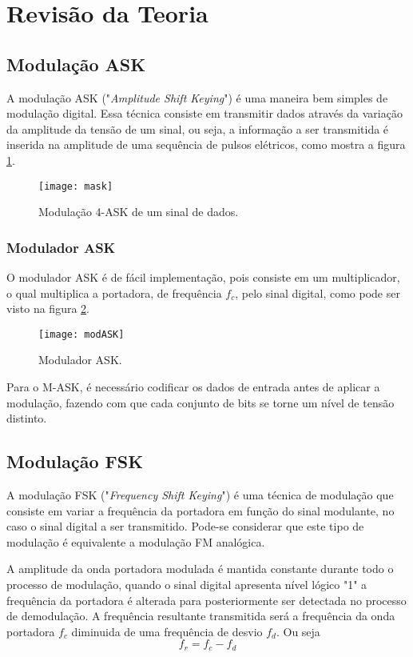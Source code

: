 \newpage
\section{Revisão da Teoria}

\subsection{Modulação ASK}

A modulação ASK ("\emph{Amplitude Shift Keying}") é uma maneira bem simples de modulação digital. Essa técnica consiste em transmitir dados através da variação da amplitude da tensão de um sinal, ou seja, a informação a ser transmitida é inserida na amplitude de uma sequência de pulsos elétricos, como mostra a figura \ref{fig:mask}. 

\begin{figure}[H]
    \centering
    \texttt{[image: mask]}
    \caption{Modulação 4-ASK de um sinal de dados.}
    \label{fig:mask}
\end{figure}

\subsubsection{Modulador ASK}
O modulador ASK é de fácil implementação, pois consiste em um multiplicador, o qual multiplica a portadora, de frequência $f_c$, pelo sinal digital, como pode ser visto na figura \ref{fig:modASK}.

\begin{figure}[H]
    \centering
    \texttt{[image: modASK]}
    \caption{Modulador ASK.}
    \label{fig:modASK}
\end{figure}

Para o M-ASK, é necessário codificar os dados de entrada antes de aplicar a modulação, fazendo com que cada conjunto de bits se torne um nível de tensão distinto.
 
\subsection{Modulação FSK}

A modulação FSK ("\emph{Frequency Shift Keying}") é uma técnica de modulação que consiste em variar a frequência da portadora em função do sinal modulante, no caso o sinal digital a ser transmitido.
Pode-se considerar que este tipo de modulação é equivalente a modulação FM analógica.

A amplitude da onda portadora modulada é mantida constante durante todo o processo de modulação, quando o sinal digital apresenta nível lógico "1" a frequência da portadora é alterada para posteriormente ser detectada no processo de demodulação.
A frequência resultante transmitida será a frequência da onda portadora $f_c$ diminuida de uma frequência de desvio $f_d$.
Ou seja
\begin{equation}
f_r = f_c - f_d
\end{equation}

